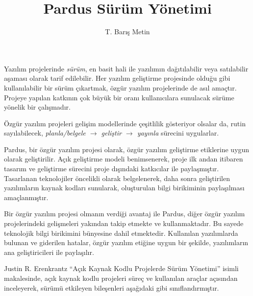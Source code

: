 \documentclass[a4]{article}
\title{Pardus Sürüm Yönetimi}
\author{T. Barış Metin}
\begin{document}
\maketitle

Yazılım projelerinde \emph{sürüm}, en basit hali ile yazılımın
dağıtılabilir veya satılabilir aşaması olarak tarif edilebilir. Her
yazılım geliştirme projesinde olduğu gibi kullanılabilir bir sürüm
çıkartmak, özgür yazılım projelerinde de asıl amaçtır. Projeye yapılan
katkının çok büyük bir oranı kullanıcılara sunulacak sürüme yönelik
bir çalışmadır.

Özgür yazılım projeleri gelişim modellerinde çeşitlilik gösteriyor
olsalar da, rutin sayılabilecek, \emph{planla/belgele $\to$ geliştir
  $\to$ yayınla} sürecini uygularlar.

Pardus, bir özgür yazılım projesi olarak, özgür yazılım geliştirme
etiklerine uygun olarak geliştirilir. Açık geliştirme modeli
benimsenerek, proje ilk andan itibaren tasarım ve geliştirme sürecini
proje dışındaki katkıcılar ile paylaşmıştır. Tasarlanan teknolojiler
öncelikli olarak belgelenerek, daha sonra geliştirilen yazılımların
kaynak kodları sunularak, oluşturulan bilgi birikiminin paylaşılması
amaçlanmıştır.

Bir özgür yazılım projesi olmanın verdiği avantaj ile Pardus, diğer
özgür yazılım projelerindeki gelişmeleri yakından takip etmekte ve
kullanmaktadır. Bu sayede teknolojik bilgi birikimini bünyesine dahil
etmektedir. Kullanılan yazılımlarda bulunan ve giderilen hatalar,
özgür yazılım etiğine uygun bir şekilde, yazılımların ana
geliştiricileri ile paylaşılır.

Justin R. Erenkrantz ``Açık Kaynak Kodlu Projelerde Sürüm
Yönetimi'' isimli makalesinde, açık kaynak kodlu projeleri süreç ve
kullanılan araçlar açısından inceleyerek, sürümü etkileyen bileşenleri
aşağıdaki gibi sınıflandırmıştır.
\end{document}

